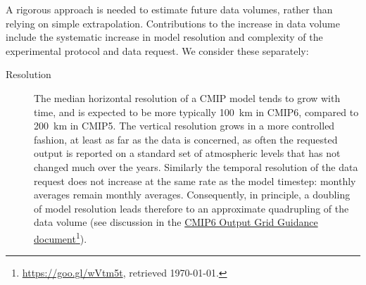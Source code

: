 \documentclass[gmd,manuscript]{copernicus}
\newcommand{\pllabel}[1]{\label{p-#1}\linelabel{l-#1}}
\newcommand{\urlref}[2] {\href{#1}{#2}\footnote{\url{#1}, retrieved \today.}}
\begin{document}
A rigorous approach is needed to estimate future
data volumes, rather than relying on simple extrapolation. Contributions to
the increase in data volume include the systematic increase in model
resolution and complexity of the experimental protocol and data
request. We consider these separately:

\begin{description}
\item[Resolution] The median horizontal resolution of a CMIP model
  tends to grow with time, and is expected to be more typically 100~km
  in CMIP6, compared to 200~km in CMIP5. The vertical resolution grows
  in a more controlled fashion, at least as far as the data is
  concerned, as often the requested output is reported on a standard
  set of atmospheric levels that has not changed much over the years.
  Similarly the temporal resolution of the data request does not
  increase at the same rate as the model timestep: monthly averages
  remain monthly averages. Consequently, in principle, a doubling of model resolution leads
  therefore to an approximate quadrupling of the data volume
  (see discussion in the
  \urlref{https://goo.gl/wVtm5t}{CMIP6 Output Grid Guidance
    document}).  


\end{description}
\end{document}
